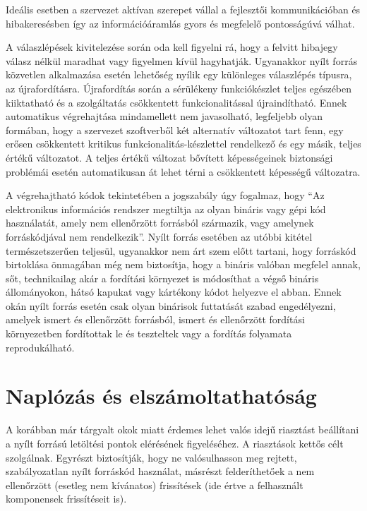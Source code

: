 \documentclass[12pt,magyar,a4paper,oneside]{scrreprt}
\begin{document}
Ideális esetben a szervezet aktívan szerepet vállal a fejlesztői
kommunikációban és hibakeresésben így az információáramlás gyors és
megfelelő pontosságúvá válhat.

A válaszlépések kivitelezése során oda kell figyelni rá, hogy a felvitt
hibajegy válasz nélkül maradhat vagy figyelmen kívül hagyhatják.
Ugyanakkor nyílt forrás közvetlen alkalmazása esetén lehetőség nyílik
egy különleges válaszlépés típusra, az újrafordításra. Újrafordítás
során a sérülékeny funkciókészlet teljes egészében kiiktatható és a
szolgáltatás csökkentett funkcionalitással újraindítható. Ennek
automatikus végrehajtása mindamellett nem javasolható, legfeljebb olyan
formában, hogy a szervezet szoftverből két alternatív változatot tart
fenn, egy erősen csökkentett kritikus funkcionalitás-készlettel
rendelkező és egy másik, teljes értékű változatot. A teljes értékű
változat bővített képességeinek biztonsági problémái esetén
automatikusan át lehet térni a csökkentett képességű változatra.

A végrehajtható kódok tekintetében a jogszabály úgy fogalmaz, hogy ``Az
elektronikus információs rendszer megtiltja az olyan bináris vagy gépi
kód használatát, amely nem ellenőrzött forrásból származik, vagy
amelynek forráskódjával nem rendelkezik''. Nyílt forrás esetében az
utóbbi kitétel természetszerűen teljesül, ugyanakkor nem árt szem előtt
tartani, hogy forráskód birtoklása önmagában még nem biztosítja, hogy a
bináris valóban megfelel annak, sőt, technikailag akár a fordítási
környezet is módosíthat a végső bináris állományokon, hátsó kapukat vagy
kártékony kódot helyezve el abban. Ennek okán nyílt forrás esetén csak
olyan binárisok futtatását szabad engedélyezni, amelyek ismert és
ellenőrzött forrásból, ismert és ellenőrzött fordítási környezetben
fordítottak le és teszteltek vagy a fordítás folyamata reprodukálható.

\hypertarget{napluxf3zuxe1s-uxe9s-elszuxe1moltathatuxf3suxe1g}{%
\section{Naplózás és
elszámoltathatóság}\label{napluxf3zuxe1s-uxe9s-elszuxe1moltathatuxf3suxe1g}}

A korábban már tárgyalt okok miatt érdemes lehet valós idejű riasztást
beállítani a nyílt forrású letöltési pontok elérésének figyeléséhez. A
riasztások kettős célt szolgálnak. Egyrészt biztosítják, hogy ne
valósulhasson meg rejtett, szabályozatlan nyílt forráskód használat,
másrészt felderíthetőek a nem ellenőrzött (esetleg nem kívánatos)
frissítések (ide értve a felhasznált komponensek frissítéseit is).
\end{document}
